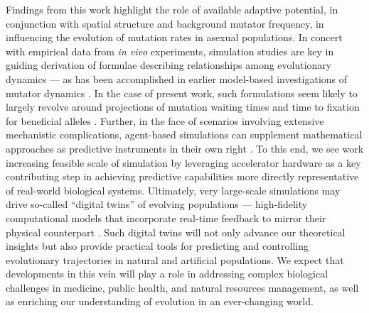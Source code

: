 Findings from this work highlight the role of available adaptive potential, in conjunction with spatial structure and background mutator frequency, in influencing the evolution of mutation rates in asexual populations.
In concert with empirical data from \textit{in vivo} experiments, simulation studies are key in guiding derivation of formulae describing relationships among evolutionary dynamics — as has been accomplished in earlier model-based investigations of mutator dynamics \citep{wylie2009fixation,raynes2018sign}.
In the case of present work, such formulations seem likely to largely revolve around projections of mutation waiting times and time to fixation for beneficial alleles \citep{ribeck2016competition}.
Further, in the face of scenarios involving extensive mechanistic complications, agent-based simulations can supplement mathematical approaches as predictive instruments in their own right \citep{an2009agent}.
To this end, we see work increasing feasible scale of simulation by leveraging accelerator hardware as a key contributing step in achieving predictive capabilities more directly representative of real-world biological systems.
Ultimately, very large-scale simulations may drive so-called ``digital twins'' of evolving populations --- high-fidelity computational models that incorporate real-time feedback to mirror their physical counterpart \citep{dekoning2023digital}.
Such digital twins will not only advance our theoretical insights but also provide practical tools for predicting and controlling evolutionary trajectories in natural and artificial populations.
We expect that developments in this vein will play a role in addressing complex biological challenges in medicine, public health, and natural resources management, as well as enriching our understanding of evolution in an ever-changing world.
